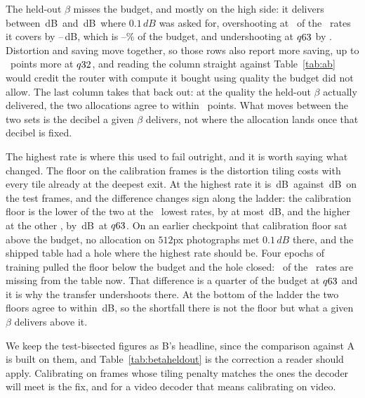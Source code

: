 \documentclass[10pt,twocolumn,letterpaper]{article}
\newcommand{\dB}{\,dB}
\begin{document}
The held-out $\beta$ misses the budget, and mostly on the high side: it delivers
between \HeldDbBest\dB\ and \HeldDbWorst\dB\ where $0.1\dB$ was asked for,
overshooting at \HeldNOver\ of the \HeldNHeld\ rates it covers by
\HeldOverMin--\HeldOverMax\dB, which is \HeldOverPctMin--\HeldOverPctMax\% of
the budget, and undershooting at $q63$ by \HeldUnderMax. Distortion
and saving move together, so those rows also report more saving, up to
\HeldGiveUpMinAbs\ points more at $q32$, and reading the column
straight against Table~\ref{tab:ab} would credit the router with compute it
bought using quality the budget did not allow. The last column takes that back
out: at the quality the held-out $\beta$ actually delivered, the two allocations
agree to within \HeldTransferAbsMax\ points. What moves between the two sets is the decibel a
given $\beta$ delivers, not where the allocation lands once that decibel is
fixed.

The highest rate is where this used to fail outright, and it is worth saying
what changed. The floor on the calibration frames is the distortion tiling
costs with every tile already at the deepest exit. At the highest rate it is
\HeldFloorCalHigh\dB\ against \HeldFloorTestHigh\dB\ on the test frames, and the
difference changes sign along the ladder: the calibration floor is the lower of
the two at the \HeldFloorNBelow\ lowest rates, by at most
\HeldFloorCalUnderMax\dB, and the higher at the other \HeldFloorNAbove, by
\HeldFloorCalOverMax\dB\ at $q63$. On an earlier
checkpoint that calibration floor sat above the budget, no allocation on
$512$px photographs met $0.1\dB$ there, and the shipped table had a hole where
the highest rate should be. Four epochs of training pulled the floor below the
budget and the hole closed: \HeldNNoBeta\ of the \HeldNRates\ rates are missing
from the table now. That difference is a quarter of the budget at
$q63$ and it is why the transfer undershoots there. At the
bottom of the ladder the two floors agree to within \HeldFloorCalUnderMax\dB,
so the shortfall there is not the floor but what a given $\beta$ delivers above
it.

We keep the test-bisected figures as B's headline, since the comparison against
A is built on them, and Table~\ref{tab:betaheldout} is the correction a reader
should apply. Calibrating on frames whose tiling penalty matches the ones the
decoder will meet is the fix, and for a video decoder that means calibrating on
video.
\end{document}
